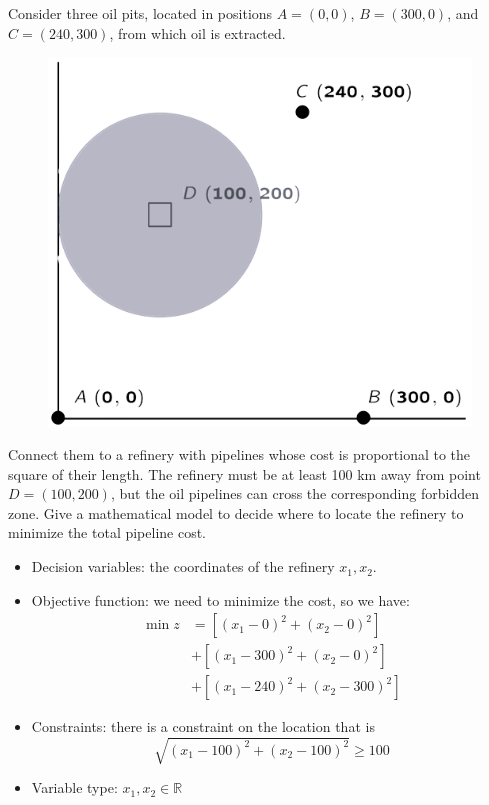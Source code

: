 \documentclass[12pt, a4paper]{report}
\begin{document}
    \begin{example}
        Consider three oil pits, located in positions $A=(0,0)$, $B=(300,0)$, and $C=(240,300)$, from which oil is extracted. 
        \begin{figure}[H]
            \centering
            \includegraphics[width=0.4\linewidth]{images/example3.png}
        \end{figure}
        Connect them to a refinery with pipelines whose cost is proportional to the square of their length. The refinery must be at least 100 km away from point $D=(100,200)$, but 
        the oil pipelines can cross the corresponding forbidden zone. Give a mathematical model to decide where to locate the refinery to minimize the total pipeline cost. 
        \begin{itemize}
            \item Decision variables: the coordinates of the refinery $x_1,x_2$. 
            \item Objective function: we need to minimize the cost, so we have: 
            \begin{align*}
                \min{z} &=\left[ (x_1-0)^2+(x_2-0)^2 \right] \\
                        &+ \left[ (x_1-300)^2+(x_2-0)^2 \right] \\
                        &+ \left[ (x_1-240)^2+(x_2-300)^2 \right] 
            \end{align*}
            \item Constraints: there is a constraint on the location that is
                \[\sqrt{{\left( x_1-100 \right)}^2+{\left( x_2-100 \right)}^2} \geq 100\]
            \item Variable type: $x_1,x_2 \in \mathbb{R}$
        \end{itemize}
    \end{example}
\end{document}
